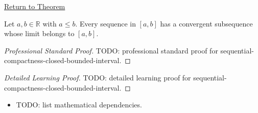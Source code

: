 \newpage
{}
\label{prf:sequential-compactness-closed-bounded-interval}

\begin{remark*}[Return]
\hyperref[thm:sequential-compactness-closed-bounded-interval]{Return to Theorem}
\end{remark*}

\begin{theorem*}
Let $a,b\in\mathbb{R}$ with $a\le b$. Every sequence in $[a,b]$ has a
convergent subsequence whose limit belongs to $[a,b]$.

\smallskip
\noindent
\end{theorem*}

\begin{proof}[Professional Standard Proof]
\LRAProofBodyStart
TODO: professional standard proof for sequential-compactness-closed-bounded-interval.
\end{proof}

\begin{proof}[Detailed Learning Proof]
\LRAProofBodyStart
TODO: detailed learning proof for sequential-compactness-closed-bounded-interval.
\end{proof}

\begin{remark*}
\end{remark*}

\begin{dependencies}
\begin{itemize}
  \item TODO: list mathematical dependencies.
\end{itemize}
\end{dependencies}

\clearpage
